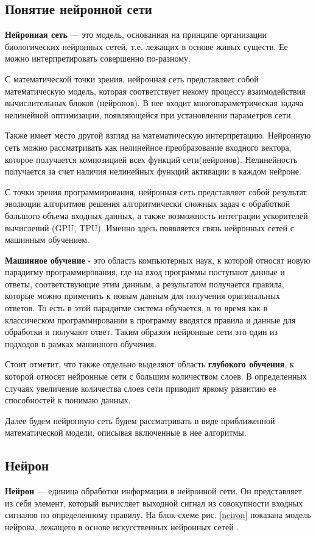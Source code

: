 \documentclass[12pt, a4paper]{article}
\begin{document}
\subsection{Понятие нейронной сети}
\textbf{Нейронная сеть} --- это модель, основанная на принципе организации биологических нейронных сетей, т.е. лежащих в основе живых существ. Ее можно интерпретировать совершенно по-разному.

С математической точки зрения, нейронная сеть представляет собой математическую модель, которая соответствует некому процессу взаимодействия вычислительных блоков (нейронов). В нее входит многопараметрическая задача нелинейной оптимизации, появляющейся при установлении параметров сети.\cite{3}

Также имеет место другой взгляд на математическую интерпретацию. Нейронную сеть можно рассматривать как нелинейное преобразование входного вектора, которое получается композицией всех функций сети(нейронов). Нелинейность получается за счет наличия нелинейных функций активации в каждом нейроне.

С точки зрения программирования, нейронная сеть представляет собой результат эволюции алгоритмов решения алгоритмически сложных задач с обработкой большого объема входных данных, а также возможность интеграции ускорителей вычислений (GPU, TPU). Именно здесь появляется связь нейронных сетей с машинным обучением. 

\textbf{Машинное обучение} - это область компьютерных наук, к которой относят новую парадигму программирования, где на вход программы поступают данные и ответы, соответствующие этим данным, а результатом получается правила, которые можно применить к новым данным для получения оригинальных ответов. То есть в этой парадигме система обучается, в то время как в классическом программировании в программу вводятся правила и данные для обработки и получают ответ. Таким образом нейронные сети это один из подходов в рамках машинного обучения. \cite[c.28]{9}

Стоит отметит, что также отдельно выделяют область \textbf{глубокого обучения}, к которой относят нейронные сети с большим количеством слоев. В определенных случаях увеличение количества слоев сети приводит яркому развитию ее способностей к понимаю данных. \cite[c.31]{9}

Далее будем нейронную сеть будем рассматривать в виде приближенной математической модели, описывая включенные в нее алгоритмы. 

\subsection{Нейрон}
\textbf{Нейрон} --- единица обработки информации в нейронной сети. Он представляет из себя элемент, который вычисляет выходной сигнал из совокупности входных сигналов по определенному правилу. На блок-схеме рис. \ref{neiron} показана модель нейрона, лежащего в основе искусственных нейронных сетей \cite[c.28]{7}. 
\end{document}
